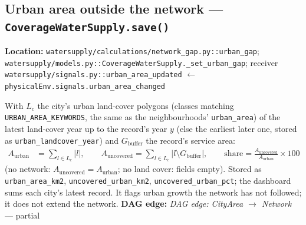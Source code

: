 \documentclass[11pt]{article}
\newcommand{\code}[1]{\texttt{#1}}
\newcommand{\dagedge}[1]{\textit{DAG edge: #1}}
\newcommand{\statuspartial}{\textcolor{orange!80!black}{partial}}
\begin{document}
\subsection{Urban area outside the network --- \code{CoverageWaterSupply.save()}}
\textbf{Location:} \code{watersupply/calculations/network\_gap.py::urban\_gap}; \code{watersupply/models.py::CoverageWaterSupply.\_set\_urban\_gap}; receiver \code{watersupply/signals.py::urban\_area\_updated} $\leftarrow$ \code{physicalEnv.signals.urban\_area\_changed}

With $L_c$ the city's urban land-cover polygons (classes matching \code{URBAN\_AREA\_KEYWORDS}, the same as the neighbourhoods' \code{urban\_area}) of the latest land-cover year up to the record's year $y$ (else the earliest later one, stored as \code{urban\_landcover\_year}) and $G_{\text{buffer}}$ the record's service area:
\begin{align}
  A_{\text{urban}} &= \sum_{l \in L_c} |l|, \qquad
  A_{\text{uncovered}} = \sum_{l \in L_c} |l \setminus G_{\text{buffer}}|, \qquad
  \text{share} = \frac{A_{\text{uncovered}}}{A_{\text{urban}}} \times 100
\end{align}
(no network: $A_{\text{uncovered}} = A_{\text{urban}}$; no land cover: fields empty). Stored as \code{urban\_area\_km2}, \code{uncovered\_urban\_km2}, \code{uncovered\_urban\_pct}; the dashboard sums each city's latest record. It flags urban growth the network has not followed; it does not extend the network. \textbf{DAG edge:} \dagedge{CityArea $\rightarrow$ Network} --- \statuspartial{}
\end{document}
